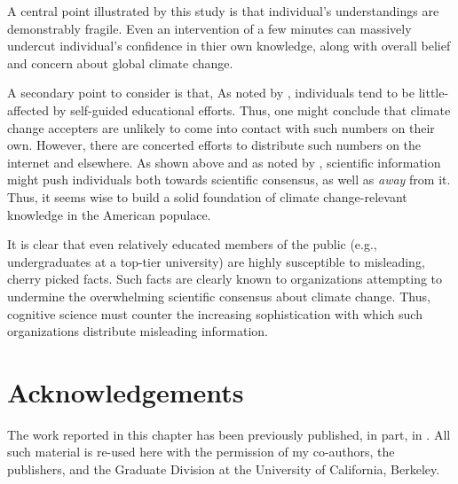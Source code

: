 A central point illustrated by this study is that individual's understandings
are demonstrably fragile. Even an intervention of a few minutes can massively
undercut individual's confidence in thier own knowledge, along with overall
belief and concern about global climate change.

A secondary point to consider is that, As noted by \textcite{kahan,mccright},
individuals tend to be little-affected by self-guided educational efforts. Thus,
one might conclude that climate change accepters are unlikely to come into
contact with such numbers on their own.  However, there are concerted efforts to
distribute such numbers on the internet and elsewhere. As shown above and as
noted by \cite{mccright}, scientific information might push individuals both
towards scientific consensus, as well as \emph{away} from it.  Thus, it seems
wise to build a solid foundation of climate change-relevant knowledge in the
American populace. 

It is clear that even relatively educated members of the public (e.g.,
undergraduates at a top-tier university) are highly susceptible to misleading,
cherry picked facts. Such facts are clearly known to organizations attempting to
undermine the overwhelming scientific consensus about climate change. Thus,
cognitive science must counter the increasing sophistication with which such
organizations distribute misleading information.

\section*{Acknowledgements}

The work reported in this chapter has been previously published, in part, in
\textcite{clark_knowledge_inpress}.  All such material is re-used here with the
permission of my co-authors, the publishers, and the Graduate Division at the
University of California, Berkeley.
